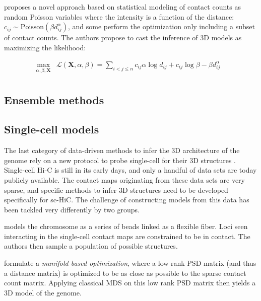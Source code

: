 \documentclass[letterpaper,12pt]{article}
\begin{document}
\citet{varoquaux:statistical} proposes a novel approach based on
statistical modeling of contact counts as random Poisson variables where the
intensity is a function of the distance: $c_{ij} \sim \text{Poisson}(\beta
d_{ij}^\alpha)$, and some perform the optimization only including a subset of
contact counts. The authors propose to cast the
inference of 3D models as maximizing the likelihood:

\begin{equation}
\renewcommand{\arraystretch}{2}
\begin{array}{cll}
\underset{\alpha, \beta, \textbf{X}}{\text{max}} &
\mathcal{L}(\mathbf{X}, \alpha, \beta) = \underset{i<j\leq n}{\sum}  c_{ij}
\alpha \log d_{ij} + c_{ij} \log \beta - \beta d_{ij}^\alpha &\\
\end{array}
\end{equation}

\subsection*{Ensemble methods}

\citet{bau:three-dimensional}
\cite{umbarger:three-dimensional}
\cite{hu:bayesian}

\subsection*{Single-cell models}

The last category of data-driven methods to infer the 3D architecture of the
genome rely on a new protocol to probe single-cell for their 3D structures
\citep{nagano:single-cell, XXX}. Single-cell Hi-C is still in its early days,
and only a handful of data sets are today publicly available. The contact maps
originating from these data sets are very sparse, and specific methods to
infer 3D structures need to be developed specifically for sc-HiC. The
challenge of constructing models from this data has been tackled very
differently by two groups. 

\citet{nagano:single-cell} models the chromosome as a series of beads linked
as a flexible fiber. Loci seen interacting in the single-cell contact maps are
constrained to be in contact. The authors then sample a population of possible
structures.

\citet{paulsen:manifold} formulate a \textit{manifold based optimization},
where a low rank PSD matrix (and thus a distance matrix) is optimized to be as
close as possible to the sparse contact count matrix. Applying classical MDS
on this low rank PSD matrix then yields a 3D model of the genome.
\end{document}
